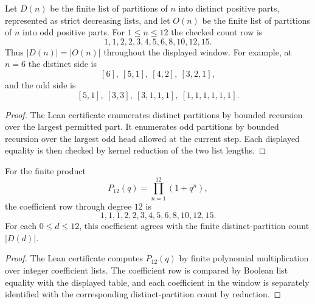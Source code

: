 \begin{theorem}
\label{thm:euler-distinct-odd-partition-count-certificate}
Let $D(n)$ be the finite list of partitions of $n$ into distinct positive parts, represented as strict decreasing lists, and let $O(n)$ be the finite list of partitions of $n$ into odd positive parts. For $1\leq n\leq 12$ the checked count row is
$$
1,1,2,2,3,4,5,6,8,10,12,15.
$$
Thus $|D(n)|=|O(n)|$ throughout the displayed window. For example, at $n=6$ the distinct side is
$$
[6],\ [5,1],\ [4,2],\ [3,2,1],
$$
and the odd side is
$$
[5,1],\ [3,3],\ [3,1,1,1],\ [1,1,1,1,1,1].
$$
\end{theorem}
\begin{proof}
The Lean certificate enumerates distinct partitions by bounded recursion over the largest permitted part. It enumerates odd partitions by bounded recursion over the largest odd head allowed at the current step. Each displayed equality is then checked by kernel reduction of the two list lengths.
\end{proof}

\begin{theorem}
\label{thm:euler-distinct-odd-partition-gf-certificate}
For the finite product
$$
P_{12}(q)=\prod_{n=1}^{12}(1+q^n),
$$
the coefficient row through degree $12$ is
$$
1,1,1,2,2,3,4,5,6,8,10,12,15.
$$
For each $0\leq d\leq 12$, this coefficient agrees with the finite distinct-partition count $|D(d)|$.
\end{theorem}
\begin{proof}
The Lean certificate computes $P_{12}(q)$ by finite polynomial multiplication over integer coefficient lists. The coefficient row is compared by Boolean list equality with the displayed table, and each coefficient in the window is separately identified with the corresponding distinct-partition count by reduction.
\end{proof}

